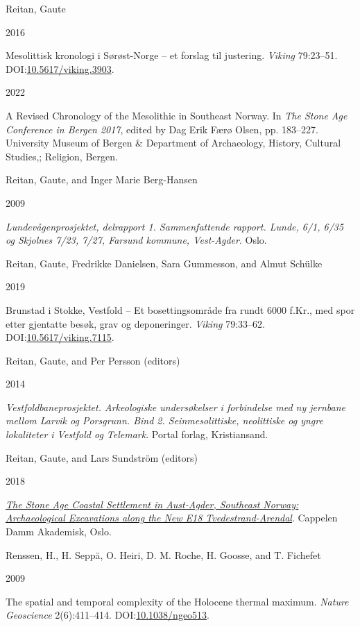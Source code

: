 \documentclass[
  12pt,
  a4paper,
  oneside]{book}
\newlength{\cslhangindent}
\newlength{\csllabelwidth}
\newlength{\cslentryspacingunit} %
\newenvironment{CSLReferences}[2] %
 {%
  \setlength{\parindent}{0pt}
  \ifodd #1
  \let\oldpar\par
  \def\par{\hangindent=\cslhangindent\oldpar}
  \fi
  \setlength{\parskip}{#2\cslentryspacingunit}
 }%
 {}
\newcommand{\CSLBlock}[1]{#1\hfill\break}
\newcommand{\CSLLeftMargin}[1]{\parbox[t]{\csllabelwidth}{#1}}
\newcommand{\CSLRightInline}[1]{\parbox[t]{\linewidth - \csllabelwidth}{#1}\break}
\begin{document}
\begin{CSLReferences}{0}{0}
\leavevmode{}%
\CSLBlock{Reitan, Gaute}
\CSLLeftMargin{ 2016}%
\CSLRightInline{{Mesolittisk kronologi i Sørøst-Norge -- et forslag til justering}. \emph{Viking} 79:23--51. DOI:\href{https://doi.org/10.5617/viking.3903}{10.5617/viking.3903}.}

\leavevmode{}%
\CSLLeftMargin{ 2022 }%
\CSLRightInline{{A Revised Chronology of the Mesolithic in Southeast Norway}. In \emph{{The Stone Age Conference in Bergen 2017}}, edited by Dag Erik Færø Olsen, pp. 183--227. University Museum of Bergen \& Department of Archaeology, History, Cultural Studies,; Religion, Bergen.}

\leavevmode{}%
\CSLBlock{Reitan, Gaute, and Inger Marie Berg-Hansen}
\CSLLeftMargin{ 2009}%
\CSLRightInline{\emph{{Lundevågenprosjektet, delrapport 1. Sammenfattende rapport. Lunde, 6/1, 6/35 og Skjolnes 7/23, 7/27, Farsund kommune, Vest-Agder}}. Oslo.}

\leavevmode{}%
\CSLBlock{Reitan, Gaute, Fredrikke Danielsen, Sara Gummesson, and Almut Schülke}
\CSLLeftMargin{ 2019}%
\CSLRightInline{{Brunstad i Stokke, Vestfold -- Et bosettingsområde fra rundt 6000 f.Kr., med spor etter gjentatte besøk, grav og deponeringer}. \emph{Viking} 79:33--62. DOI:\href{https://doi.org/10.5617/viking.7115}{10.5617/viking.7115}.}

\leavevmode{}%
\CSLBlock{Reitan, Gaute, and Per Persson (editors)}
\CSLLeftMargin{ 2014}%
\CSLRightInline{\emph{{Vestfoldbaneprosjektet. Arkeologiske undersøkelser i forbindelse med ny jernbane mellom Larvik og Porsgrunn. Bind 2. Seinmesolittiske, neolittiske og yngre lokaliteter i Vestfold og Telemark}}. Portal forlag, Kristiansand.}

\leavevmode{}%
\CSLBlock{Reitan, Gaute, and Lars Sundström (editors)}
\CSLLeftMargin{ 2018}%
\CSLRightInline{\emph{\href{https://doi.org/10.23865/noasp.50}{{The Stone Age Coastal Settlement in Aust-Agder, Southeast Norway: Archaeological Excavations along the New E18 Tvedestrand-Arendal}}}. Cappelen Damm Akademisk, Oslo.}

\leavevmode{}%
\CSLBlock{Renssen, H., H. Seppä, O. Heiri, D. M. Roche, H. Goosse, and T. Fichefet}
\CSLLeftMargin{ 2009}%
\CSLRightInline{{The spatial and temporal complexity of the Holocene thermal maximum}. \emph{Nature Geoscience} 2(6):411--414. DOI:\href{https://doi.org/10.1038/ngeo513}{10.1038/ngeo513}.}


\end{CSLReferences}
\end{document}
